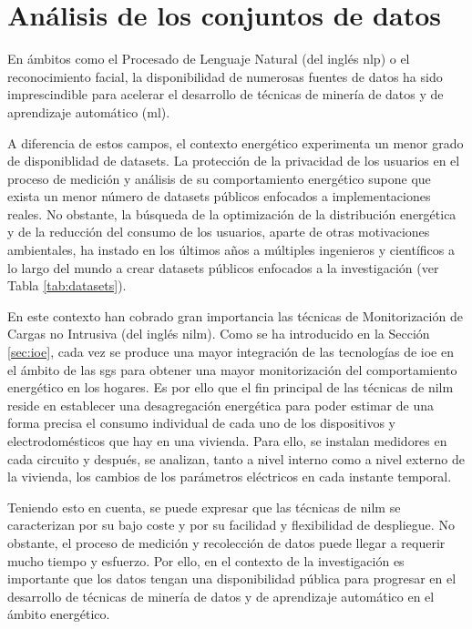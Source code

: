 \section{Análisis de los conjuntos de datos}
\label{sec:sustdata}

En ámbitos como el Procesado de Lenguaje Natural (del inglés \gls{nlp}) o el reconocimiento facial, la disponibilidad de numerosas fuentes de datos ha sido imprescindible para acelerar el desarrollo de técnicas de minería de datos y de aprendizaje automático (\gls{ml}).

\vspace{3mm}

A diferencia de estos campos, el contexto energético experimenta un menor grado de disponiblidad de datasets. La protección de la privacidad de los usuarios en el proceso de medición y análisis de su comportamiento energético supone que exista un menor número de datasets públicos enfocados a implementaciones reales. No obstante, la búsqueda de la optimización de la distribución energética y de la reducción del consumo de los usuarios, aparte de otras motivaciones ambientales, ha instado en los últimos años a múltiples ingenieros y científicos a lo largo del mundo a crear datasets públicos enfocados a la investigación (ver Tabla \ref{tab:datasets}). 

\vspace{3mm}

En este contexto han cobrado gran importancia las técnicas de Monitorización de Cargas no Intrusiva (del inglés \gls{nilm}). Como se ha introducido en la Sección \ref{sec:ioe}, cada vez se produce una mayor integración de las tecnologías de \gls{ioe} en el ámbito de las \gls{sg}s para obtener una mayor monitorización del comportamiento energético en los hogares. Es por ello que el fin principal de las técnicas de \gls{nilm} reside en establecer una desagregación energética para poder estimar de una forma precisa el consumo individual de cada uno de los dispositivos y electrodomésticos que hay en una vivienda. Para ello, se instalan medidores en cada circuito y después, se analizan, tanto a nivel interno como a nivel externo de la vivienda, los cambios de los parámetros eléctricos en cada instante temporal.~\cite{nilm} \cite{greend}

\vspace{3mm}

Teniendo esto en cuenta, se puede expresar que las técnicas de \gls{nilm} se caracterizan por su bajo coste y por su facilidad y flexibilidad de despliegue. No obstante, el proceso de medición y recolección de datos puede llegar a requerir mucho tiempo y esfuerzo. Por ello, en el contexto de la investigación es importante que los datos tengan una disponibilidad pública para progresar en el desarrollo de técnicas de minería de datos y de aprendizaje automático en el ámbito energético. 

